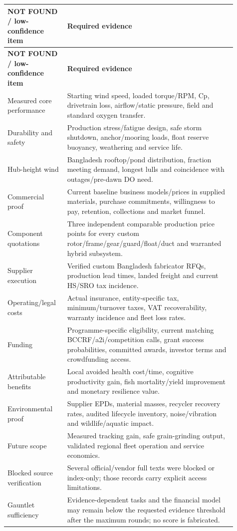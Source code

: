 \documentclass[11pt,a4paper]{article}
\begin{document}
{\small
\setlength{\tabcolsep}{3pt}\renewcommand{\arraystretch}{1.18}
\begin{longtable}{@{}>{\raggedright\arraybackslash}p{0.2275\linewidth}>{\raggedright\arraybackslash}p{0.6825\linewidth}@{}}
\toprule \textbf{NOT FOUND / low-confidence item} & \textbf{Required evidence} \\ \midrule
\endfirsthead\toprule \textbf{NOT FOUND / low-confidence item} & \textbf{Required evidence} \\ \midrule
\endhead\bottomrule\endfoot
Measured core performance & Starting wind speed, loaded torque/RPM, Cp, drivetrain loss, airflow/static pressure, field and standard oxygen transfer. \\
Durability and safety & Production stress/fatigue design, safe storm shutdown, anchor/mooring loads, float reserve buoyancy, weathering and service life. \\
Hub-height wind & Bangladesh rooftop/pond distribution, fraction meeting demand, longest lulls and coincidence with outages/pre-dawn DO need. \\
Commercial proof & Current baseline business models/prices in supplied materials, purchase commitments, willingness to pay, retention, collections and market funnel. \\
Component quotations & Three independent comparable production price points for every custom rotor/frame/gear/guard/float/duct and warranted hybrid subsystem. \\
Supplier execution & Verified custom Bangladesh fabricator RFQs, production lead times, landed freight and current HS/SRO tax incidence. \\
Operating/legal costs & Actual insurance, entity-specific tax, minimum/turnover taxes, VAT recoverability, warranty incidence and fleet loss rates. \\
Funding & Programme-specific eligibility, current matching BCCRF/a2i/competition calls, grant success probabilities, committed awards, investor terms and crowdfunding access. \\
Attributable benefits & Local avoided health cost/time, cognitive productivity gain, fish mortality/yield improvement and monetary resilience value. \\
Environmental proof & Supplier EPDs, material masses, recycler recovery rates, audited lifecycle inventory, noise/vibration and wildlife/aquatic impact. \\
Future scope & Measured tracking gain, safe grain-grinding output, validated regional fleet operation and service economics. \\
Blocked source verification & Several official/vendor full texts were blocked or index-only; those records carry explicit access limitations. \\
Gauntlet sufficiency & Evidence-dependent tasks and the financial model may remain below the requested evidence threshold after the maximum rounds; no score is fabricated. \\
\end{longtable}}
\end{document}
